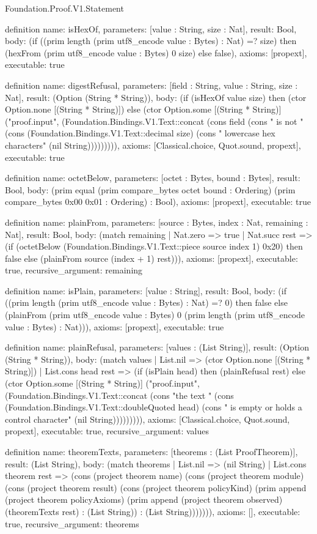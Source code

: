 \begin{lexlean}{Foundation.Proof.V1.Statement}
\begin{semanticmodule}
definition{
  name: isHexOf,
  parameters: [value : String, size : Nat],
  result: Bool,
  body: (if ((prim length (prim utf8_encode value : Bytes) : Nat) =? size) then (hexFrom (prim utf8_encode value : Bytes) 0 size) else false),
  axioms: [propext],
  executable: true
}

definition{
  name: digestRefusal,
  parameters: [field : String, value : String, size : Nat],
  result: (Option (String * String)),
  body: (if (isHexOf value size) then (ctor Option.none [(String * String)]) else (ctor Option.some [(String * String)] ("proof.input", (Foundation.Bindings.V1.Text::concat (cons field (cons " is not " (cons (Foundation.Bindings.V1.Text::decimal size) (cons " lowercase hex characters" (nil String))))))))),
  axioms: [Classical.choice, Quot.sound, propext],
  executable: true
}

definition{
  name: octetBelow,
  parameters: [octet : Bytes, bound : Bytes],
  result: Bool,
  body: (prim equal (prim compare_bytes octet bound : Ordering) (prim compare_bytes 0x00 0x01 : Ordering) : Bool),
  axioms: [propext],
  executable: true
}

definition{
  name: plainFrom,
  parameters: [source : Bytes, index : Nat, remaining : Nat],
  result: Bool,
  body: (match remaining
    | Nat.zero => true
    | Nat.succ rest => (if (octetBelow (Foundation.Bindings.V1.Text::piece source index 1) 0x20) then false else (plainFrom source (index + 1) rest))),
  axioms: [propext],
  executable: true,
  recursive_argument: remaining
}

definition{
  name: isPlain,
  parameters: [value : String],
  result: Bool,
  body: (if ((prim length (prim utf8_encode value : Bytes) : Nat) =? 0) then false else (plainFrom (prim utf8_encode value : Bytes) 0 (prim length (prim utf8_encode value : Bytes) : Nat))),
  axioms: [propext],
  executable: true
}

definition{
  name: plainRefusal,
  parameters: [values : (List String)],
  result: (Option (String * String)),
  body: (match values
    | List.nil => (ctor Option.none [(String * String)])
    | List.cons head rest => (if (isPlain head) then (plainRefusal rest) else (ctor Option.some [(String * String)] ("proof.input", (Foundation.Bindings.V1.Text::concat (cons "the text " (cons (Foundation.Bindings.V1.Text::doubleQuoted head) (cons " is empty or holds a control character" (nil String))))))))),
  axioms: [Classical.choice, Quot.sound, propext],
  executable: true,
  recursive_argument: values
}

definition{
  name: theoremTexts,
  parameters: [theorems : (List ProofTheorem)],
  result: (List String),
  body: (match theorems
    | List.nil => (nil String)
    | List.cons theorem rest => (cons (project theorem name) (cons (project theorem module) (cons (project theorem result) (cons (project theorem policyKind) (prim append (project theorem policyAxioms) (prim append (project theorem observed) (theoremTexts rest) : (List String)) : (List String))))))),
  axioms: [],
  executable: true,
  recursive_argument: theorems
}


\end{semanticmodule}
\end{lexlean}
